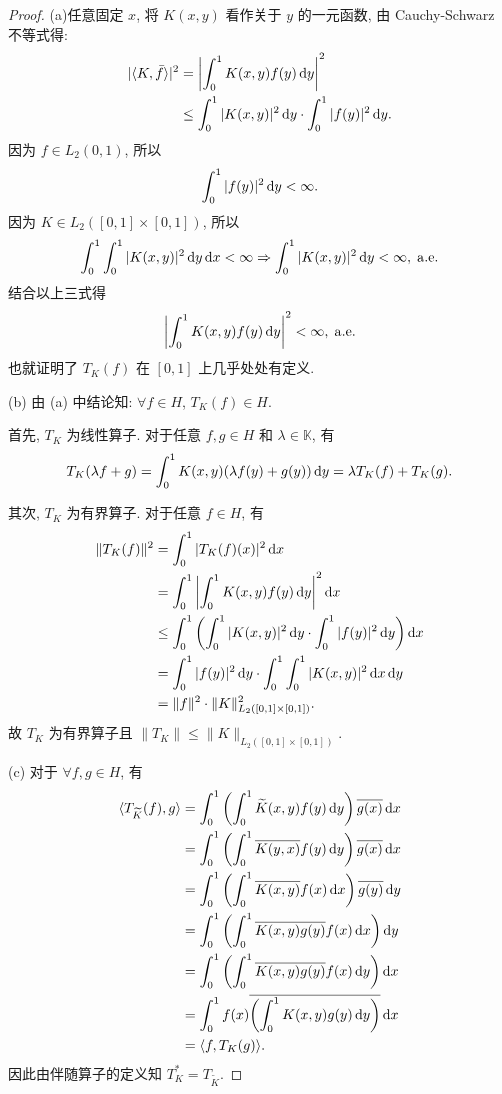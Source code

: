 \begin{proof}
    (a)任意固定 $x$, 将 $K(x,y)$ 看作关于 $y$ 的一元函数, 由 Cauchy-Schwarz 不等式得:
    \begin{align*}
        |\langle K,\bar{f}\rangle|^2
        & =\left|\int_0^1K(x,y)f(y)\mathop{}\!\mathrm{d} y\right|^2 \\
        & \leq\int_0^1|K(x,y)|^2\mathop{}\!\mathrm{d} y\cdot\int_0^1|f(y)|^2\mathop{}\!\mathrm{d} y.
    \end{align*}
    因为 $f\in L_2(0,1)$, 所以
    \[\int_0^1|f(y)|^2\mathop{}\!\mathrm{d} y<\infty.\]
    因为 $K\in L_2([0,1]\times [0,1])$, 所以
    \[\int_0^1\int_0^1|K(x,y)|^2\mathop{}\!\mathrm{d} y\mathop{}\!\mathrm{d} x<\infty\Rightarrow\int_0^1|K(x,y)|^2\mathop{}\!\mathrm{d} y<\infty, \;\mathrm{a.e.}\]
    结合以上三式得
    \[\left|\int_0^1K(x,y)f(y)\mathop{}\!\mathrm{d} y\right|^2<\infty, \;\mathrm{a.e.}\]
    也就证明了 $T_K(f)$ 在 $[0,1]$ 上几乎处处有定义.

    (b) 由 (a) 中结论知: $\forall f\in H$, $T_K(f)\in H$.

    首先, $T_K$ 为线性算子. 对于任意 $f,g\in H$ 和 $\lambda\in\mathbb{K}$, 有
    \[T_K(\lambda f+g)=\int_0^1K(x,y)(\lambda f(y)+g(y))\mathop{}\!\mathrm{d} y=\lambda T_K(f)+T_K(g).\] 

    其次, $T_K$ 为有界算子. 对于任意 $f\in H$, 有
    \begin{align*}
        \|T_K(f)\|^2
        &=\int_0^1|T_K(f)(x)|^2\diff x\\
        &=\int_0^1\left|\int_0^1K(x,y)f(y)\diff y\right|^2\diff x\\
        &\leq \int_0^1\left(\int_0^1|K(x,y)|^2\diff y\cdot\int_0^1|f(y)|^2\diff y\right)\diff x\\
        &=\int_0^1|f(y)|^2\diff y\cdot\int_0^1\int_0^1|K(x,y)|^2\diff x\diff y\\
        &=\|f\|^2\cdot\|K\|_{L_2([0,1]\times[0,1])}^2.
    \end{align*}
    故 $T_K$ 为有界算子且 $\|T_K\|\leq \|K\|_{L_2([0,1]\times [0,1])}$.


    (c) 对于 $\forall f,g\in H$, 有
    \begin{align*}
        \langle T_{\widetilde{K}}(f),g\rangle&=\int_0^1\left(\int_0^1\widetilde{K}(x,y)f(y)\diff y\right)\conjugate{g(x)}\diff x\\
        &=\int_0^1\left(\int_0^1\overline{K(y,x)}f(y)\diff y\right)\conjugate{g(x)}\diff x \\
        &=\int_0^1\left(\int_0^1\overline{K(x,y)}f(x)\diff x\right)\conjugate{g(y)}\diff y \\
        &=\int_0^1\left(\int_0^1\overline{K(x,y)g(y)}f(x)\diff x\right)\diff y \\
        &=\int_0^1\left(\int_0^1\overline{K(x,y)g(y)}f(x)\diff y\right)\diff x \\
        &=\int_0^1f(x)\overline{\left(\int_0^1K(x,y)g(y)\diff y\right)}\diff x \\
        &=\langle f,T_K(g)\rangle.
    \end{align*}
    因此由伴随算子的定义知 $T_K^{*}=T_{\widetilde{K}}$.


\end{proof}
